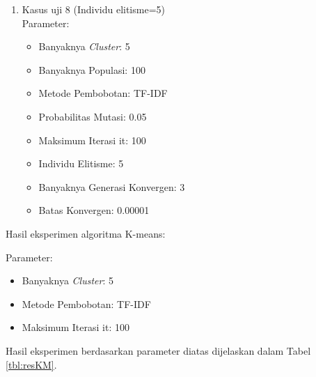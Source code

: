 \begin{enumerate}
	\item Kasus uji 8 (Individu elitisme=5)\\
	Parameter:
	\begin{itemize}
		\item Banyaknya \textit{Cluster}: 5
		\item Banyaknya Populasi: 100
		\item Metode Pembobotan: TF-IDF
		\item Probabilitas Mutasi: 0.05
		\item Maksimum Iterasi it: 100
		\item Individu Elitisme: 5
		\item Banyaknya Generasi Konvergen: 3
		\item Batas Konvergen: 0.00001
	\end{itemize}
\end{enumerate}

Hasil eksperimen algoritma K-means:

Parameter:
\begin{itemize}
	\item Banyaknya \textit{Cluster}: 5
	\item Metode Pembobotan: TF-IDF
	\item Maksimum Iterasi it: 100
\end{itemize}

Hasil eksperimen berdasarkan parameter diatas dijelaskan dalam Tabel \ref{tbl:resKM}.

